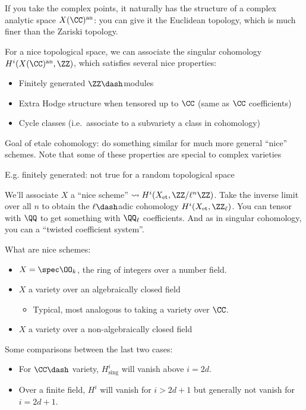 If you take the complex points, it naturally has the structure of a
complex analytic space \(X(\CC)^{\text{an}}\): you can give it the
Euclidean topology, which is much finer than the Zariski topology.

For a nice topological space, we can associate the singular cohomology
\(H^i(X(\CC)^{\text{an}}, \ZZ)\), which satisfies several nice
properties:

\begin{itemize}
\tightlist
\item
  Finitely generated \(\ZZ\dash\)modules
\item
  Extra Hodge structure when tensored up to \(\CC\) (same as \(\CC\)
  coefficients)
\item
  Cycle classes (i.e.~associate to a subvariety a class in cohomology)
\end{itemize}

Goal of etale cohomology: do something similar for much more general
``nice'' schemes. Note that some of these properties are special to
complex varieties

E.g. finitely generated: not true for a random topological space

We'll associate \(X\) a ``nice scheme''
\(\rightsquigarrow H^i(X_{\text{et}}, \ZZ/\ell^n\ZZ)\). Take the inverse
limit over all \(n\) to obtain the \(\ell\dash\)adic cohomology
\(H^i(X_{\text{et}}, \ZZ_\ell)\). You can tensor with \(\QQ\) to get
something with \(\QQ_\ell\) coefficients. And as in singular cohomology,
you can a ``twisted coefficient system''.

What are nice schemes:

\begin{itemize}
\tightlist
\item
  \(X = \spec \OO_k\), the ring of integers over a number field.
\item
  \(X\) a variety over an algebraically closed field

  \begin{itemize}
  \tightlist
  \item
    Typical, most analogous to taking a variety over \(\CC\).
  \end{itemize}
\item
  \(X\) a variety over a non-algebraically closed field
\end{itemize}

Some comparisons between the last two cases:

\begin{itemize}
\tightlist
\item
  For \(\CC\dash\) variety, \(H^i_{\text{sing}}\) will vanish above
  \(i=2d\).
\item
  Over a finite field, \(H^i\) will vanish for \(i>2d+1\) but generally
  not vanish for \(i=2d+1\).
\end{itemize}

